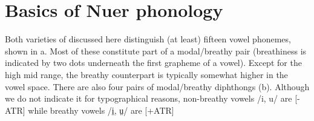 \documentclass[output=paper,newtxmath,modfonts,nonflat,draftmode]{langsci/langscibook}
\begin{document}
\section{Basics of Nuer phonology} %

Both varieties of  discussed here distinguish (at least) fifteen vowel pho\-nemes, shown in a. Most of these constitute part of a modal/breathy pair (breathiness is indicated by two dots underneath the first grapheme of a vowel). Except for the high mid range, the breathy counterpart is typically somewhat higher in the vowel space. There are also four pairs of modal/breathy diphthongs (b). Although we do not indicate it for typographical reasons, non-breathy vowels /i, u/ are [-ATR] while breathy vowels /i̤, ṳ/ are [+ATR]


\end{document}
